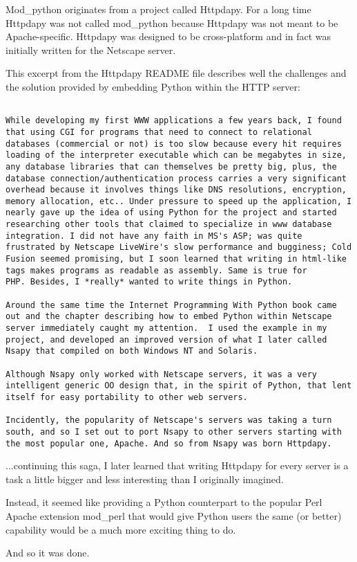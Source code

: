 Mod_python originates from a project called Httpdapy. For a long time
Httpdapy was not called mod_python because Httpdapy was not meant to
be Apache-specific. Httpdapy was designed to be cross-platform and in
fact was initially written for the Netscape server.

This excerpt from the Httpdapy README file describes well the
challenges and the solution provided by embedding Python within the
HTTP server:

\begin{verbatim}

While developing my first WWW applications a few years back, I found
that using CGI for programs that need to connect to relational
databases (commercial or not) is too slow because every hit requires
loading of the interpreter executable which can be megabytes in size,
any database libraries that can themselves be pretty big, plus, the
database connection/authentication process carries a very significant
overhead because it involves things like DNS resolutions, encryption,
memory allocation, etc.. Under pressure to speed up the application, I
nearly gave up the idea of using Python for the project and started
researching other tools that claimed to specialize in www database
integration. I did not have any faith in MS's ASP; was quite
frustrated by Netscape LiveWire's slow performance and bugginess; Cold
Fusion seemed promising, but I soon learned that writing in html-like
tags makes programs as readable as assembly. Same is true for
PHP. Besides, I *really* wanted to write things in Python.

Around the same time the Internet Programming With Python book came
out and the chapter describing how to embed Python within Netscape
server immediately caught my attention.  I used the example in my
project, and developed an improved version of what I later called
Nsapy that compiled on both Windows NT and Solaris.

Although Nsapy only worked with Netscape servers, it was a very
intelligent generic OO design that, in the spirit of Python, that lent
itself for easy portability to other web servers.

Incidently, the popularity of Netscape's servers was taking a turn
south, and so I set out to port Nsapy to other servers starting with
the most popular one, Apache. And so from Nsapy was born Httpdapy.

\end{verbatim}

...continuing this saga, I later learned that writing Httpdapy for
every server is a task a little bigger and less interesting than I
originally imagined.

Instead, it seemed like providing a Python counterpart to the popular
Perl Apache extension mod_perl that would give Python users the same
(or better) capability would be a much more exciting thing to do.

And so it was done. 

